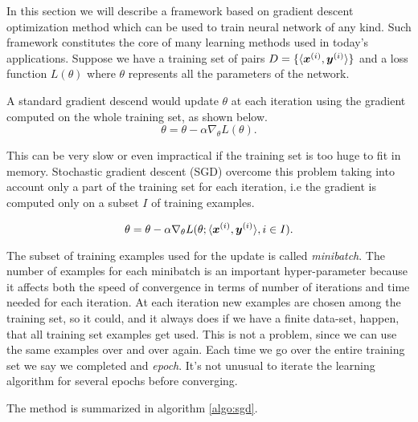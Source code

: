In this section we will describe a framework based on gradient descent optimization method which can be used to train 
neural network of any kind. Such framework constitutes the core of many learning methods used in today's applications. 
Suppose we have a training set of pairs $D=\{\langle\boldsymbol{x}^{(i)},\boldsymbol{y}^{(i)}\rangle\}$ and a loss function $L(\theta)$ 
where $\theta$ represents all the parameters of the network.

A standard gradient descend would update $\theta$ at each iteration using the gradient computed on the whole training 
set, as shown below.
\begin{equation}
 \theta = \theta - \alpha \nabla_\theta L(\theta).
\end{equation}

This can be very slow or even impractical if the training set is too huge to fit in memory. Stochastic gradient descent (SGD)
overcome this problem taking into account only a part of the training set for each iteration, i.e the gradient is 
computed only on a subset $I$ of training examples. 

\begin{equation}
 \theta = \theta - \alpha \nabla_\theta L(\theta; \langle\boldsymbol{x}^{(i)},\boldsymbol{y}^{(i)}\rangle, i\in I)
 \label{eq:updateRule}.
\end{equation}

The subset of training examples used for the update is called \textit{minibatch}. The number of examples for each 
minibatch is an important hyper-parameter because it affects both the speed of convergence in terms of number of 
iterations and time needed for each iteration. At each iteration new examples are chosen among the training set, so it could, and it always does if we have a finite data-set, happen, that all training set examples get used.
This is not a problem, since we can use the same examples over and over again. Each time we go over the entire training 
set we say we completed and \textit{epoch}. It's not unusual to iterate the learning algorithm for several epochs 
before converging.

The method is summarized in algorithm \ref{algo:sgd}.


